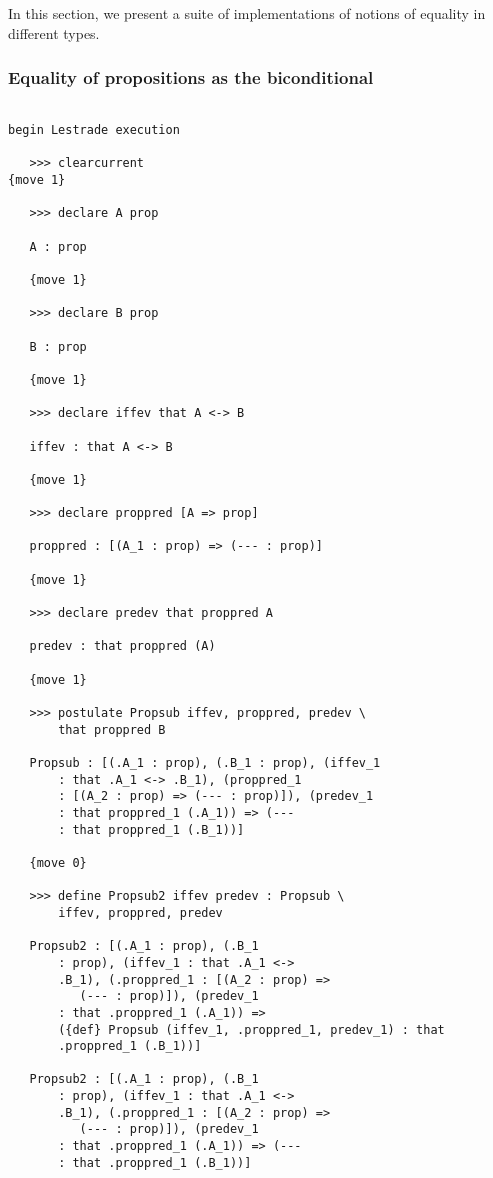 \documentclass[12pt]{article}
\begin{document}
In this section, we present a suite of implementations of notions of equality in different types.

\subsubsection{Equality of propositions as the biconditional}

\begin{verbatim}

begin Lestrade execution

   >>> clearcurrent
{move 1}

   >>> declare A prop

   A : prop

   {move 1}

   >>> declare B prop

   B : prop

   {move 1}

   >>> declare iffev that A <-> B

   iffev : that A <-> B

   {move 1}

   >>> declare proppred [A => prop]

   proppred : [(A_1 : prop) => (--- : prop)]

   {move 1}

   >>> declare predev that proppred A

   predev : that proppred (A)

   {move 1}

   >>> postulate Propsub iffev, proppred, predev \
       that proppred B

   Propsub : [(.A_1 : prop), (.B_1 : prop), (iffev_1 
       : that .A_1 <-> .B_1), (proppred_1 
       : [(A_2 : prop) => (--- : prop)]), (predev_1 
       : that proppred_1 (.A_1)) => (--- 
       : that proppred_1 (.B_1))]

   {move 0}

   >>> define Propsub2 iffev predev : Propsub \
       iffev, proppred, predev

   Propsub2 : [(.A_1 : prop), (.B_1 
       : prop), (iffev_1 : that .A_1 <-> 
       .B_1), (.proppred_1 : [(A_2 : prop) => 
          (--- : prop)]), (predev_1 
       : that .proppred_1 (.A_1)) => 
       ({def} Propsub (iffev_1, .proppred_1, predev_1) : that 
       .proppred_1 (.B_1))]

   Propsub2 : [(.A_1 : prop), (.B_1 
       : prop), (iffev_1 : that .A_1 <-> 
       .B_1), (.proppred_1 : [(A_2 : prop) => 
          (--- : prop)]), (predev_1 
       : that .proppred_1 (.A_1)) => (--- 
       : that .proppred_1 (.B_1))]


\end{verbatim}
\end{document}
